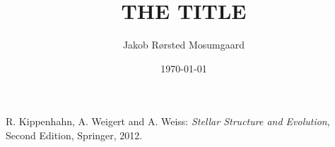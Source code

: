 \documentclass[a4paper, oneside, 11pt, article]{memoir}
\author{Jakob Rørsted Mosumgaard}
\title{THE TITLE}
\date{\today}
\begin{document}
\maketitle


%
%
\begin{thebibliography}{9}
 R. Kippenhahn, A. Weigert and A. Weiss: \textsl{Stellar
    Structure and Evolution}, Second Edition, Springer, 2012.
\end{thebibliography}
\end{document}
